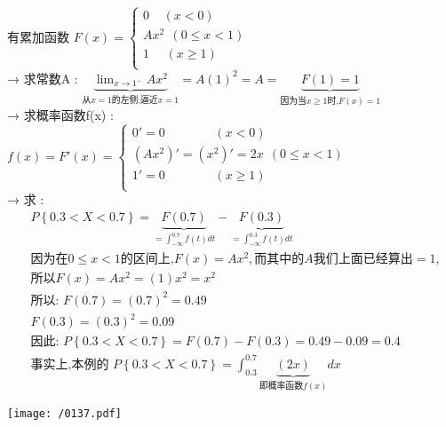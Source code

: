 \documentclass[UTF8]{ctexart}
\begin{document}
	\begin{myEnvSample}
		有累加函数 $F\left( x \right) =\left\{ \begin{array}{l}
			0\ \ \ \ \ \left( x<0 \right)\\
			Ax^2\ \ \left( 0\leq x<1 \right)\\
			1\ \ \ \ \ \ \left( x\geq 1 \right)\\
		\end{array} \right. $ \\
		
		→ 求常数A :  
		$
		\underset{\text{从}x=1\text{的左侧,逼近}x=1}{\underbrace{\lim_{x\rightarrow 1^-}Ax^2}}=A\left( 1 \right) ^2=A=\underset{\text{因为当}x\geq 1\text{时,}F\left( x \right) =1}{\underbrace{F\left( 1 \right) =1}}
		$ \\
		
		→ 求概率函数f(x) : 
		$
		f\left( x \right) =F'\left( x \right) =\left\{ \begin{array}{l}
			0'=0\ \ \ \ \ \ \ \ \ \ \ \ \ \ \ \ \ \ \left( x<0 \right)\\
			\left( Ax^2 \right) '=\left( x^2 \right) '=2x\ \ \left( 0\leq x<1 \right)\\
			1'=0\ \ \ \ \ \ \ \ \ \ \ \ \ \ \ \ \ \ \left( x\geq 1 \right)\\
		\end{array} \right. 
		$ \\
		
		→ 求 :
		\begin{align*}  %
			&P\left\{ 0.3<X<0.7 \right\} =\underset{=\int_{-\infty}^{0.7}{f\left( t \right)}dt}{\underbrace{F\left( 0.7 \right) }}-\underset{=\int_{-\infty}^{0.3}{f\left( t \right)}dt}{\underbrace{F\left( 0.3 \right) }}\\
			&\text{因为在}0\leq x<1\text{的区间上,}F\left( x \right) =Ax^2,\text{而其中的}A\text{我们上面已经算出}=1,\\
			&\text{所以}F\left( x \right) =Ax^2=\left( 1 \right) x^2=x^2\\
			&\text{所以:\ }F\left( 0.7 \right) =\left( 0.7 \right) ^2=0.49\\
			&F\left( 0.3 \right) =\left( 0.3 \right) ^2=0.09\\
			&\text{因此:\ }P\left\{ 0.3<X<0.7 \right\} =F\left( 0.7 \right) -F\left( 0.3 \right) =0.49-0.09=0.4\\
			&\text{事实上,本例的\ }P\left\{ 0.3<X<0.7 \right\} =\int_{0.3}^{0.7}{\underset{\text{即概率函数}f\left( x \right)}{\underbrace{\left( 2x \right) }}}dx  
		\end{align*}
		
		\texttt{[image: /0137.pdf]}
		
	\end{myEnvSample}
	
\end{document}
